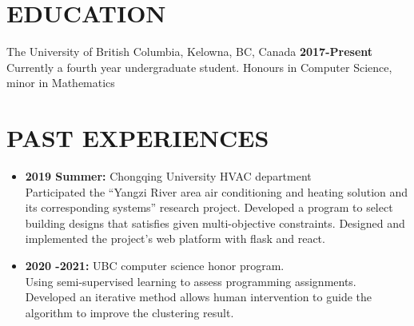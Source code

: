\documentclass{res}
\begin{document}

\address{\textbf{Email:} jimmy123good@hotmail.com \\
        \textbf{Github: }https://github.com/ailrk \\
         \textbf{Blog:}    https://ailrk.github.io/home \\
         \textbf{Contact:}  (250) 899 2600}
\begin{resume}

\section{EDUCATION}
The University of British Columbia, Kelowna, BC, Canada  \hspace{1.2in} \textbf{2017-Present}\\
    Currently a fourth year undergraduate student. Honours in Computer Science, minor in Mathematics \\

\vspace{-0.2in}
\section{PAST EXPERIENCES}
\begin{itemize}[leftmargin=-.1in]
    \item \textbf{2019 Summer:} Chongqing University HVAC department
        \vspace{0.05in}\\ Participated the ``Yangzi River area air conditioning and heating solution and its corresponding systems'' research project. Developed a program to select building designs that satisfies given multi-objective constraints.
     Designed and implemented the project's web platform with flask and react. \\
    \item \textbf{2020 -2021: } UBC computer science honor program. \\
        \vspace{0.05in} Using semi-supervised learning to assess programming assignments. Developed an iterative method allows human intervention to guide the algorithm to improve the clustering result. \\


\end{itemize}


\end{resume}
\end{document}
